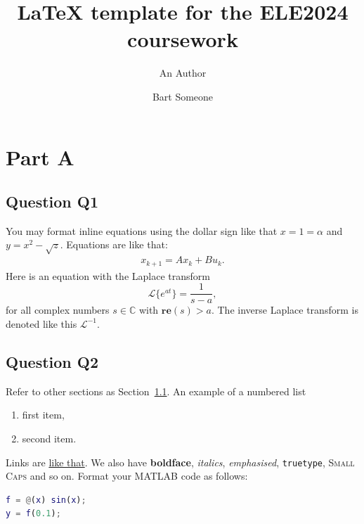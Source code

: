 \documentclass[a4paper,10pt,reqno]{amsart}
\title[ELE2024 Coursework]{LaTeX template for the ELE2024 coursework}
\author[A. Author]{An Author}
\author[B. Someone]{Bart Someone}
\numberwithin{equation}{section}
\renewcommand{\Re}{\mathbf{re}}
\newcommand{\C}{\mathbb{C}}
\newcommand{\lap}{\mathscr{L}}
\begin{document}
\maketitle


\section{Part A}

\subsection{Question Q1}\label{sec:q1}
You may format inline equations using the dollar sign 
like that $x = 1 = \alpha$ and $y = x^2 - \sqrt{z}$. 
Equations are like that:
\begin{align}
 \label{eq:lti_state_update}
 x_{k+1} = A x_k + Bu_k.
\end{align}
Here is an equation with the Laplace transform
\begin{equation}
    \lap \{e^{at}\} = \frac{1}{s-a},
\end{equation}
for all complex numbers $s\in\C$ with $\Re(s)>a$.
The inverse Laplace transform is denoted like this $\lap^{-1}$.




\subsection{Question Q2}
Refer to other sections as Section~\ref{sec:q1}. An example of a numbered list
\begin{enumerate}
 \item first item,
 \item second item.
\end{enumerate}
Links are \href{https://google.com}{like that}. We also have \textbf{boldface}, \textit{italics},
\emph{emphasised}, \texttt{truetype}, \textsc{Small Caps} and so on.
Format your MATLAB code as follows:
\begin{lstlisting}[language=matlab]
% My code:
f = @(x) sin(x);
y = f(0.1);
\end{lstlisting}
\end{document}

